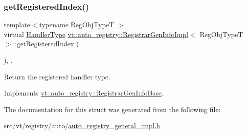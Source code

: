 \subsubsection{\texorpdfstring{get\+Registered\+Index()}{getRegisteredIndex()}}
{\footnotesize\ttfamily template$<$typename Reg\+Obj\+TypeT $>$ \\
virtual \hyperlink{namespacevt_af64846b57dfcaf104da3ef6967917573}{Handler\+Type} \hyperlink{structvt_1_1auto__registry_1_1_registrar_gen_info_impl}{vt\+::auto\+\_\+registry\+::\+Registrar\+Gen\+Info\+Impl}$<$ Reg\+Obj\+TypeT $>$\+::get\+Registered\+Index (\begin{DoxyParamCaption}{ }\end{DoxyParamCaption})\hspace{0.3cm}{\ttfamily [inline]}, {\ttfamily [override]}, {\ttfamily [virtual]}}



Return the registered handler type. 



Implements \hyperlink{structvt_1_1auto__registry_1_1_registrar_gen_info_base_ac498c953bb4a951399d66272cae76b05}{vt\+::auto\+\_\+registry\+::\+Registrar\+Gen\+Info\+Base}.



The documentation for this struct was generated from the following file\+:\begin{DoxyCompactItemize}
\item 
src/vt/registry/auto/\hyperlink{auto__registry__general__impl_8h}{auto\+\_\+registry\+\_\+general\+\_\+impl.\+h}\end{DoxyCompactItemize}

